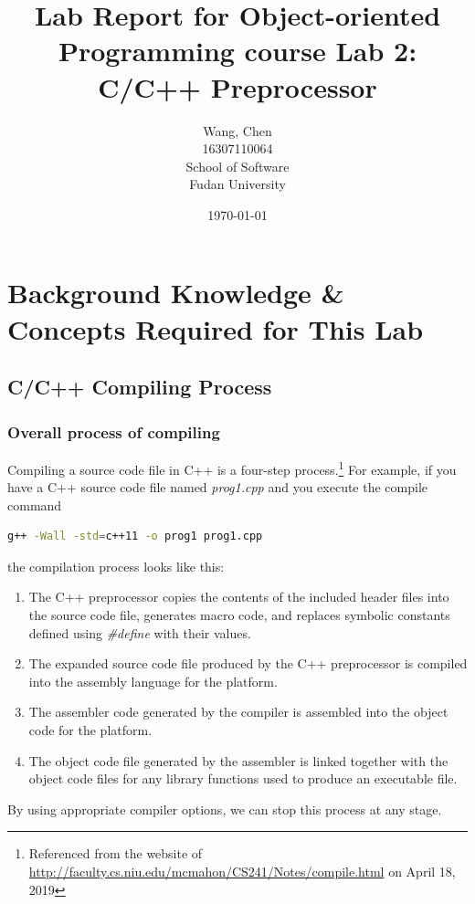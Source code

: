 \documentclass[a4paper]{report}
\title{Lab Report for Object-oriented Programming course \newline
 Lab 2: C/C++ Preprocessor}
\author{Wang, Chen \\ 16307110064 \\ School of Software\\ Fudan University}
\date{\today}
\begin{document}
\maketitle

\tableofcontents

\chapter{Background Knowledge \& Concepts Required for This Lab}
\section{C/C++ Compiling Process}

\subsection{Overall process of compiling}
Compiling a source code file in C++ is a four-step process.\footnote{Referenced from the website of \url{http://faculty.cs.niu.edu/mcmahon/CS241/Notes/compile.html} on April 18, 2019}
 For example, if you have a C++ source code file named \emph{prog1.cpp} and you execute the compile command
 \begin{lstlisting}[language=bash]
g++ -Wall -std=c++11 -o prog1 prog1.cpp
\end{lstlisting}
the compilation process looks like this:
\begin{enumerate}
\item
The C++ preprocessor copies the contents of the included header files into the source code file, generates macro code, and replaces symbolic constants defined using \emph{\#define} with their values.
\item
The expanded source code file produced by the C++ preprocessor is compiled into the assembly language for the platform.
\item
The assembler code generated by the compiler is assembled into the object code for the platform.
\item
The object code file generated by the assembler is linked together with the object code files for any library functions used to produce an executable file.
\end{enumerate}
By using appropriate compiler options, we can stop this process at any stage.
\end{document}
